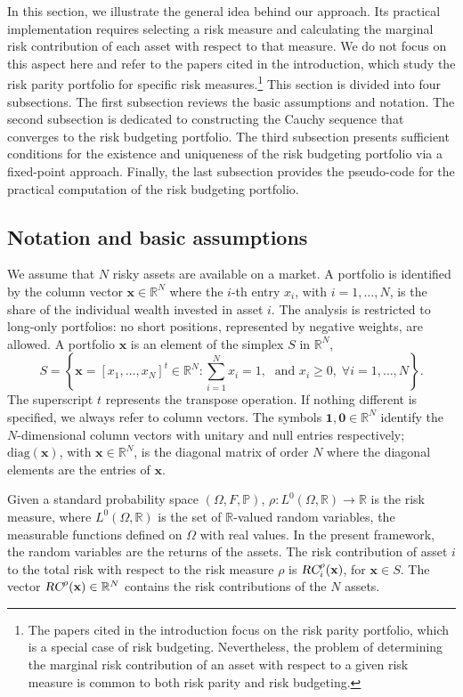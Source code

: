\documentclass[preprint,11pt,authoryear]{elsarticle}
\begin{document}
In this section, we illustrate the general idea behind our approach. Its practical implementation requires selecting a risk measure and calculating the marginal risk contribution of each asset with respect to that measure. We do not focus on this aspect here and refer to the papers cited in the introduction, which study the risk parity portfolio for specific risk measures.\footnote{The papers cited in the introduction focus on the risk parity portfolio, which is a special case of risk budgeting. Nevertheless, the problem of determining the marginal risk contribution of an asset with respect to a given risk measure is common to both risk parity and risk budgeting.}
This section is divided into four subsections. The first subsection reviews the basic assumptions and notation. The second subsection is dedicated to constructing the Cauchy sequence that converges to the risk budgeting portfolio. The third subsection presents sufficient conditions for the existence and uniqueness of the risk budgeting portfolio via a fixed-point approach. Finally, the last subsection provides the pseudo-code for the practical computation of the risk budgeting portfolio.



\subsection{Notation and basic assumptions}
We assume that $N$ risky assets are available on a market. A portfolio is identified by the column vector $\mathbf{x} \in \mathbb{R}^{N}$ where the $i$-th entry $x_i$, with $i = 1,\ldots,N$, is the share of the individual wealth invested in asset $i$. The analysis is restricted to long-only portfolios: no short positions, represented by negative weights, are allowed. A portfolio $\mathbf{x}$ is an element of the simplex $S$ in $\mathbb{R}^{N}$, 
$$S = \left\{\mathbf{x} = [x_1,\ldots, x_N]^t \in \mathbb R^N : \sum_{i=1}^{N} x_i=1, \; \textrm{ and } x_i \geq 0, \; \forall i =1,\ldots,N \right\}.$$ 
The superscript $t$ represents the transpose operation. If nothing different is specified, we always refer to column vectors. The symbols $\mathbf{1}, \mathbf{0} \in \mathbb{R}^{N}$ identify the $N$-dimensional column vectors with unitary and null entries respectively; $\textrm{diag}(\mathbf{x})$, with $\mathbf{x} \in \mathbb{R}^{N}$, is the diagonal matrix of order $N$ where the diagonal elements are the entries of $\mathbf{x}$.%

Given a standard probability space $(\Omega, F, \mathbb P)$, $\rho:L^0(\Omega, \mathbb R) \rightarrow \mathbb R$ is the risk measure, where $L^0(\Omega, \mathbb R)$ is the set of $\mathbb R$-valued random variables, the measurable functions defined on $\Omega$ with real values. In the present framework, the random variables are the returns of the assets. The risk contribution of asset $i$ to the total risk with respect to the risk measure $\rho$ is $\textsl{RC}^{\rho}_i(\mathbf{x})$, for $\mathbf{x} \in S$. The vector $\textsl{RC}^{\rho}(\mathbf{x}) \in \mathbb{R}^{N}$ contains the risk contributions of the $N$ assets. 
\end{document}
